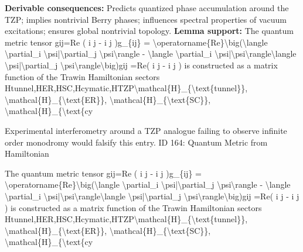 \textbf{Derivable consequences:} Predicts quantized phase accumulation around the TZP; implies nontrivial Berry phases; influences spectral properties of vacuum excitations; ensures global nontrivial topology.
\textbf{Lemma support:} The quantum metric tensor gij=Re (  i   j  -  i        j  )g\_\{ij\} = \textbackslash{}operatorname\{Re\}\textbackslash{}big(\textbackslash{}langle \textbackslash{}partial\_i \textbackslash{}psi|\textbackslash{}partial\_j \textbackslash{}psi\textbackslash{}rangle - \textbackslash{}langle \textbackslash{}partial\_i \textbackslash{}psi|\textbackslash{}psi\textbackslash{}rangle\textbackslash{}langle \textbackslash{}psi|\textbackslash{}partial\_j \textbackslash{}psi\textbackslash{}rangle\textbackslash{}big)gij =Re(  i    j   -  i         j   ) is constructed as a matrix function of the Trawin Hamiltonian sectors Htunnel,HER,HSC,Hcymatic,HTZP\textbackslash{}mathcal\{H\}\_\{\textbackslash{}text\{tunnel\}\}, \textbackslash{}mathcal\{H\}\_\{\textbackslash{}text\{ER\}\}, \textbackslash{}mathcal\{H\}\_\{\textbackslash{}text\{SC\}\}, \textbackslash{}mathcal\{H\}\_\{\textbackslash{}text\{cy\par
\endgroup

Experimental interferometry around a TZP analogue failing to observe infinite order monodromy would falsify this entry. ID 164: Quantum Metric from Hamiltonian

The quantum metric tensor gij=Re (  i   j  -  i        j  )g\_\{ij\} = \textbackslash{}operatorname\{Re\}\textbackslash{}big(\textbackslash{}langle \textbackslash{}partial\_i \textbackslash{}psi|\textbackslash{}partial\_j \textbackslash{}psi\textbackslash{}rangle - \textbackslash{}langle \textbackslash{}partial\_i \textbackslash{}psi|\textbackslash{}psi\textbackslash{}rangle\textbackslash{}langle \textbackslash{}psi|\textbackslash{}partial\_j \textbackslash{}psi\textbackslash{}rangle\textbackslash{}big)gij =Re(  i    j   -  i         j   ) is constructed as a matrix function of the Trawin Hamiltonian sectors Htunnel,HER,HSC,Hcymatic,HTZP\textbackslash{}mathcal\{H\}\_\{\textbackslash{}text\{tunnel\}\}, \textbackslash{}mathcal\{H\}\_\{\textbackslash{}text\{ER\}\}, \textbackslash{}mathcal\{H\}\_\{\textbackslash{}text\{SC\}\}, \textbackslash{}mathcal\{H\}\_\{\textbackslash{}text\{cy

